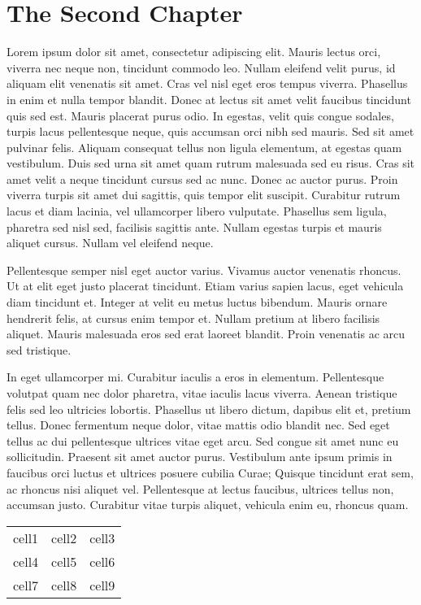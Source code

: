 \chapter{The Second Chapter}

Lorem ipsum dolor sit amet, consectetur adipiscing elit. Mauris lectus orci, viverra nec neque non, tincidunt commodo leo. Nullam eleifend velit purus, id aliquam elit venenatis sit amet. Cras vel nisl eget eros tempus viverra. Phasellus in enim et nulla tempor blandit. Donec at lectus sit amet velit faucibus tincidunt quis sed est. Mauris placerat purus odio. In egestas, velit quis congue sodales, turpis lacus pellentesque neque, quis accumsan orci nibh sed mauris. Sed sit amet pulvinar felis. Aliquam consequat tellus non ligula elementum, at egestas quam vestibulum. Duis sed urna sit amet quam rutrum malesuada sed eu risus. Cras sit amet velit a neque tincidunt cursus sed ac nunc. Donec ac auctor purus. Proin viverra turpis sit amet dui sagittis, quis tempor elit suscipit. Curabitur rutrum lacus et diam lacinia, vel ullamcorper libero vulputate. Phasellus sem ligula, pharetra sed nisl sed, facilisis sagittis ante. Nullam egestas turpis et mauris aliquet cursus. Nullam vel eleifend neque.

Pellentesque semper nisl eget auctor varius. Vivamus auctor venenatis rhoncus. Ut at elit eget justo placerat tincidunt. Etiam varius sapien lacus, eget vehicula diam tincidunt et. Integer at velit eu metus luctus bibendum. Mauris ornare hendrerit felis, at cursus enim tempor et. Nullam pretium at libero facilisis aliquet. Mauris malesuada eros sed erat laoreet blandit. Proin venenatis ac arcu sed tristique.

In eget ullamcorper mi. Curabitur iaculis a eros in elementum. Pellentesque volutpat quam nec dolor pharetra, vitae iaculis lacus viverra. Aenean tristique felis sed leo ultricies lobortis. Phasellus ut libero dictum, dapibus elit et, pretium tellus. Donec fermentum neque dolor, vitae mattis odio blandit nec. Sed eget tellus ac dui pellentesque ultrices vitae eget arcu. Sed congue sit amet nunc eu sollicitudin. Praesent sit amet auctor purus. Vestibulum ante ipsum primis in faucibus orci luctus et ultrices posuere cubilia Curae; Quisque tincidunt erat sem, ac rhoncus nisi aliquet vel. Pellentesque at lectus faucibus, ultrices tellus non, accumsan justo. Curabitur vitae turpis aliquet, vehicula enim eu, rhoncus quam.

\begin{center}
	\begin{tabular}{ |c|c|c| } 
		\hline
		cell1 & cell2 & cell3 \\ 
		cell4 & cell5 & cell6 \\ 
		cell7 & cell8 & cell9 \\ 
		\hline
	\end{tabular}
\end{center}
